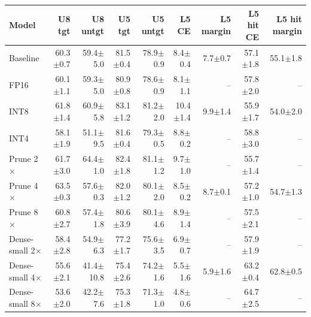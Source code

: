 \begin{tabular}{lrrrrrrrr}
\toprule
Model & U8 tgt & U8 untgt & U5 tgt & U5 untgt & L5 CE & L5 margin & L5 hit CE & L5 hit margin \\
\midrule
Baseline & 60.3{\scriptsize$\pm$0.7} & 59.4{\scriptsize$\pm$5.0} & 81.5{\scriptsize$\pm$0.4} & 78.9{\scriptsize$\pm$0.9} & 8.4{\scriptsize$\pm$0.4} & 7.7{\scriptsize$\pm$0.7} & 57.1{\scriptsize$\pm$1.8} & 55.1{\scriptsize$\pm$1.8} \\
\midrule
FP16 & 60.1{\scriptsize$\pm$1.1} & 59.3{\scriptsize$\pm$5.0} & 80.9{\scriptsize$\pm$0.8} & 78.6{\scriptsize$\pm$0.9} & 8.1{\scriptsize$\pm$1.1} & -- & 57.8{\scriptsize$\pm$2.0} & -- \\
INT8 & 61.8{\scriptsize$\pm$1.4} & 60.9{\scriptsize$\pm$5.8} & 83.1{\scriptsize$\pm$1.2} & 81.2{\scriptsize$\pm$2.0} & 10.4{\scriptsize$\pm$1.4} & 9.9{\scriptsize$\pm$1.4} & 55.9{\scriptsize$\pm$1.7} & 54.0{\scriptsize$\pm$2.0} \\
INT4 & 58.1{\scriptsize$\pm$1.9} & 51.1{\scriptsize$\pm$9.5} & 81.6{\scriptsize$\pm$0.4} & 79.3{\scriptsize$\pm$0.5} & 8.8{\scriptsize$\pm$0.2} & -- & 58.8{\scriptsize$\pm$3.0} & -- \\
\midrule
Prune 2$\times$ & 61.7{\scriptsize$\pm$3.0} & 64.4{\scriptsize$\pm$1.0} & 82.4{\scriptsize$\pm$1.8} & 81.1{\scriptsize$\pm$1.2} & 9.7{\scriptsize$\pm$1.0} & -- & 55.7{\scriptsize$\pm$1.4} & -- \\
Prune 4$\times$ & 63.5{\scriptsize$\pm$0.3} & 57.6{\scriptsize$\pm$0.3} & 82.0{\scriptsize$\pm$1.2} & 80.1{\scriptsize$\pm$2.0} & 8.5{\scriptsize$\pm$0.2} & 8.7{\scriptsize$\pm$0.1} & 57.2{\scriptsize$\pm$1.0} & 54.7{\scriptsize$\pm$1.3} \\
Prune 8$\times$ & 60.8{\scriptsize$\pm$2.7} & 57.4{\scriptsize$\pm$1.8} & 80.6{\scriptsize$\pm$3.9} & 80.1{\scriptsize$\pm$4.6} & 8.9{\scriptsize$\pm$1.4} & -- & 57.5{\scriptsize$\pm$2.1} & -- \\
\midrule
Dense-small 2$\times$ & 58.4{\scriptsize$\pm$2.8} & 54.9{\scriptsize$\pm$6.3} & 77.2{\scriptsize$\pm$1.7} & 75.6{\scriptsize$\pm$3.5} & 6.9{\scriptsize$\pm$0.7} & -- & 57.9{\scriptsize$\pm$1.9} & -- \\
Dense-small 4$\times$ & 55.6{\scriptsize$\pm$2.1} & 41.4{\scriptsize$\pm$10.8} & 75.4{\scriptsize$\pm$2.6} & 74.2{\scriptsize$\pm$1.6} & 5.5{\scriptsize$\pm$1.6} & 5.9{\scriptsize$\pm$1.6} & 63.2{\scriptsize$\pm$0.4} & 62.8{\scriptsize$\pm$0.5} \\
Dense-small 8$\times$ & 53.6{\scriptsize$\pm$2.0} & 42.2{\scriptsize$\pm$7.6} & 75.3{\scriptsize$\pm$1.8} & 71.3{\scriptsize$\pm$1.0} & 4.8{\scriptsize$\pm$0.6} & -- & 64.7{\scriptsize$\pm$2.5} & -- \\

\end{tabular}
